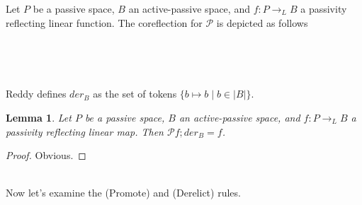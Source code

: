 \documentclass{article}
\newtheorem{lemma}{Lemma}
\newcommand{\smc}[1]{#1}
\begin{document}
Let $P$ be a passive space, $B$ an active-passive space, and $f : P \to_L B$ a passivity reflecting linear function. The coreflection for $\mathcal P$ is depicted as follows
\begin{center}
~\\
~\\
\end{center}
Reddy defines $\mathit{der}_B$ as the set of tokens $\{ b \mapsto b \mid b \in |B| \}$.
\begin{lemma}
Let $P$ be a passive space, $B$ an active-passive space, and $f : P \to_L B$ a passivity reflecting linear map. 
Then $\mathcal Pf;\mathit{der}_B = f$.
\end{lemma}

\begin{proof}
Obvious.
\end{proof}~\\
Now let's examine the \smc{(Promote)} and \smc{(Derelict)} rules.

\end{document}
